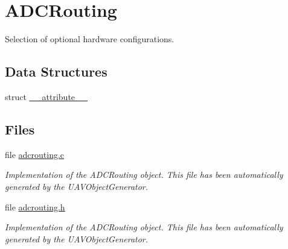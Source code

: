 \hypertarget{group___a_d_c_routing}{\section{\-A\-D\-C\-Routing}
\label{group___a_d_c_routing}
}


\-Selection of optional hardware configurations.  


\subsection*{\-Data \-Structures}
\begin{DoxyCompactItemize}
\item 
struct \hyperlink{struct____attribute____}{\-\_\-\-\_\-attribute\-\_\-\-\_\-}
\end{DoxyCompactItemize}
\subsection*{\-Files}
\begin{DoxyCompactItemize}
\item 
file \hyperlink{adcrouting_8c}{adcrouting.\-c}
\begin{DoxyCompactList}\small\item\em \-Implementation of the \-A\-D\-C\-Routing object. \-This file has been automatically generated by the \-U\-A\-V\-Object\-Generator. \end{DoxyCompactList}\item 
file \hyperlink{adcrouting_8h}{adcrouting.\-h}
\begin{DoxyCompactList}\small\item\em \-Implementation of the \-A\-D\-C\-Routing object. \-This file has been automatically generated by the \-U\-A\-V\-Object\-Generator. \end{DoxyCompactList}\end{DoxyCompactItemize}

